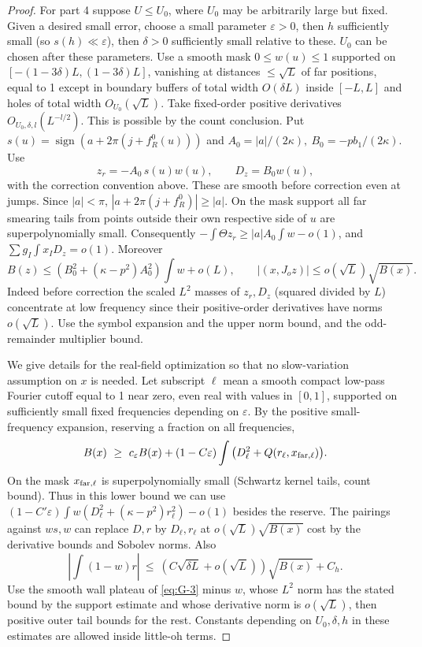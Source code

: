 \begin{proof}
For part 4 suppose \(U\le U_0\), where \(U_0\) may be arbitrarily large but fixed. Given a desired small error, choose a small parameter \(\varepsilon>0\), then \(h\) sufficiently small (so \(s(h)\ll\varepsilon\)), then \(\delta>0\) sufficiently small relative to these. \(U_0\) can be chosen after these parameters. Use a smooth mask \(0\le w(u)\le1\) supported on \([-(1-3\delta)L,(1-3\delta)L]\), vanishing at distances \(\le\sqrt L\) of far positions, equal to 1 except in boundary buffers of total width \(O(\delta L)\) inside \([-L,L]\) and holes of total width \(O_{U_0}(\sqrt L)\). Take fixed-order positive derivatives \(O_{U_0,\delta,l}(L^{-l/2})\). This is possible by the count conclusion. Put \(s(u)=\operatorname{sign}(a+2\pi(j+f_R^0(u)))\) and \(A_0=|a|/(2\kappa),\ B_0=-p b_1/(2\kappa)\). Use
\[
 z_r=-A_0\,s(u)w(u),\qquad D_z=B_0 w(u),
\]
with the correction convention above. These are smooth before correction even at jumps. Since \(|a|<\pi\), \(|a+2\pi(j+f_R^0)|\ge |a|\). On the mask support all far smearing tails from points outside their own respective side of \(u\) are superpolynomially small. Consequently \(-\int\Theta z_r\ge |a| A_0\int w-o(1)\), and \(\sum g_I\int x_I D_z=o(1)\). Moreover
\[
 B(z)\le (B_0^2+(\kappa-p^2)A_0^2)\int w+o(L),\qquad
 |(x,J_o z)|\le o(\sqrt L)\sqrt{B(x)} .
\]
Indeed before correction the scaled \(L^2\) masses of \(z_r,D_z\) (squared divided by \(L\)) concentrate at low frequency since their positive-order derivatives have norms \(o(\sqrt L)\). Use the symbol expansion and the upper norm bound, and the odd-remainder multiplier bound.

We give details for the real-field optimization so that no slow-variation assumption on \(x\) is needed. Let subscript \(\ell\) mean a smooth compact low-pass Fourier cutoff equal to 1 near zero, even real with values in \([0,1]\), supported on sufficiently small fixed frequencies depending on \(\varepsilon\). By the positive small-frequency expansion, reserving a fraction on all frequencies,
\[
 B(x)\ \ge\ c_\varepsilon B(x)
 +(1-C\varepsilon)\int \big(D_\ell^2+Q(r_\ell,x_{{\rm far},\ell})\big).
\]
On the mask \(x_{{\rm far},\ell}\) is superpolynomially small (Schwartz kernel tails, count bound). Thus in this lower bound we can use \((1-C'\varepsilon)\int w(D_\ell^2+(\kappa-p^2)r_\ell^2)-o(1)\) besides the reserve. The pairings against \(ws,w\) can replace \(D,r\) by \(D_\ell,r_\ell\) at \(o(\sqrt L)\sqrt{B(x)}\) cost by the derivative bounds and Sobolev norms. Also
\[
 |\int(1-w)r|\ \le\
 (C\sqrt{\delta L}+o(\sqrt L))\sqrt{B(x)}+C_h .
\]
Use the smooth wall plateau of \eqref{eq:G-3} minus \(w\), whose \(L^2\) norm has the stated bound by the support estimate and whose derivative norm is \(o(\sqrt L)\), then positive outer tail bounds for the rest. Constants depending on \(U_0,\delta,h\) in these estimates are allowed inside little-oh terms.


\end{proof}

